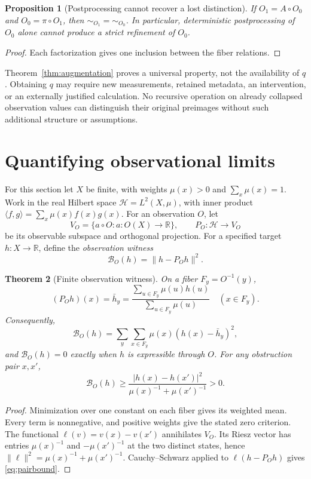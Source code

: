 \documentclass[11pt,letterpaper]{article}
\newtheorem{theorem}{Theorem}[section]
\newtheorem{proposition}[theorem]{Proposition}
\newcommand{\HH}{\mathcal H}
\newcommand{\R}{\mathbb R}
\begin{document}
\begin{proposition}[Postprocessing cannot recover a lost distinction]\label{prop:nofree}
If $O_1=A\circ O_0$ and $O_0=\pi\circ O_1$, then
$\sim_{O_1}=\sim_{O_0}$. In particular, deterministic postprocessing of
$O_0$ alone cannot produce a strict refinement of $O_0$.
\end{proposition}
\begin{proof}
Each factorization gives one inclusion between the fiber relations.
\end{proof}
Theorem~\ref{thm:augmentation} proves a universal property, not the availability
of $q$. Obtaining $q$ may require new measurements, retained metadata, an
intervention, or an externally justified calculation. No recursive operation
on already collapsed observation values can distinguish their original
preimages without such additional structure or assumptions.

\section{Quantifying observational limits}\label{sec:finite}
For this section let $X$ be finite, with weights $\mu(x)>0$ and
$\sum_x\mu(x)=1$. Work in the real Hilbert space
$\HH=L^2(X,\mu)$, with inner product
$\langle f,g\rangle=\sum_x\mu(x)f(x)g(x)$.
For an observation $O$, let
\[
V_O=\{a\circ O:a:O(X)\to\R\},\qquad
P_O:\HH\to V_O
\]
be its observable subspace and orthogonal projection. For a specified
target $h:X\to\R$, define the \emph{observation witness}
\begin{equation}\label{eq:obswit}
\mathcal B_O(h)=\|h-P_Oh\|^2.
\end{equation}

\begin{theorem}[Finite observation witness]\label{thm:obswit}
On a fiber $F_y=O^{-1}(y)$,
\[
(P_Oh)(x)=\bar h_y
=\frac{\sum_{u\in F_y}\mu(u)h(u)}{\sum_{u\in F_y}\mu(u)}
\quad (x\in F_y).
\]
Consequently,
\[
\mathcal B_O(h)=\sum_y\sum_{x\in F_y}\mu(x)(h(x)-\bar h_y)^2,
\]
and $\mathcal B_O(h)=0$ exactly when $h$ is expressible through $O$.
For any obstruction pair $x,x'$,
\begin{equation}\label{eq:pairbound}
\mathcal B_O(h)\ge
\frac{|h(x)-h(x')|^2}{\mu(x)^{-1}+\mu(x')^{-1}}>0.
\end{equation}
\end{theorem}
\begin{proof}
Minimization over one constant on each fiber gives its weighted mean.
Every term is nonnegative, and positive weights give the stated zero
criterion. The functional $\ell(v)=v(x)-v(x')$ annihilates $V_O$.
Its Riesz vector has entries $\mu(x)^{-1}$ and $-\mu(x')^{-1}$ at the
two distinct states, hence
$\|\ell\|^2=\mu(x)^{-1}+\mu(x')^{-1}$.
Cauchy--Schwarz applied to $\ell(h-P_Oh)$ gives \eqref{eq:pairbound}.
\end{proof}
\end{document}
